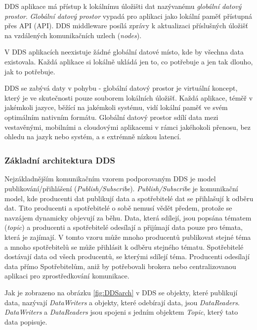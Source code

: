 \acs{DDS} aplikace má přístup k lokálnímu úložišti dat nazývanému \textit{globální datový prostor}. \textit{Globální datový prostor} vypadá pro aplikaci jako lokální paměť přístupná přes \acs{API} (\acl{API}). \acs{DDS} middleware posílá zprávy k aktualizaci příslušných úložišť na vzdálených komunikačních uzlech (\textit{nodes}).

V \acs{DDS} aplikacích neexistuje žádné globální datové místo, kde by všechna data existovala. Každá aplikace si lokálně ukládá jen to, co potřebuje a jen tak dlouho, jak to potřebuje. \cite{DDS_Main}

\acs{DDS} se zabývá daty v pohybu - globální datový prostor je virtuální koncept, který je ve skutečnosti pouze souborem lokálních úložišť. Každá aplikace, téměř v jakémkoli jazyce, běžící na jakémkoli systému, vidí lokální paměť ve svém optimálním nativním formátu. Globální datový prostor sdílí data mezi vestavěnými, mobilními a cloudovými aplikacemi v rámci jakéhokoli přenosu, bez ohledu na jazyk nebo systém, a s extrémně nízkou latencí.

\subsubsection{Základní architektura DDS\texorpdfstring{\textsuperscript{\textregistered}}{ (R)}}

Nejzákladnějším komunikačním vzorem podporovaným \acs{DDS} je model publikování/přihlášení (\textit{Publish/Subscribe}). \textit{Publish/Subscribe} je komunikační model, kde producenti dat publikují data a spotřebitelé dat se přihlašují k odběru dat. Tito producenti a spotřebitelé o sobě nemusí vědět předem, protože se navzájem dynamicky objevují za běhu. Data, která sdílejí, jsou popsána tématem (\textit{topic}) a producenti a spotřebitelé odesílají a přijímají data pouze pro témata, která je zajímají. V tomto vzoru může mnoho producentů publikovat stejné téma a mnoho spotřebitelů se může přihlásit k odběru stejného tématu. Spotřebitelé dostávají data od všech producentů, se kterými sdílejí téma. Producenti odesílají data přímo Spotřebitelům, aniž by potřebovali brokera nebo centralizovanou aplikaci pro zprostředkování komunikace. \cite{DDS_PubSub}

Jak je zobrazeno na obrázku \ref{fig:DDSarch} v \acs{DDS} se objekty, které publikují data, nazývají \textit{DataWriters} a objekty, které odebírají data, jsou \textit{DataReaders}. \textit{DataWriters} a \textit{DataReaders} jsou spojeni s jedním objektem \textit{Topic}, který tato data popisuje.

